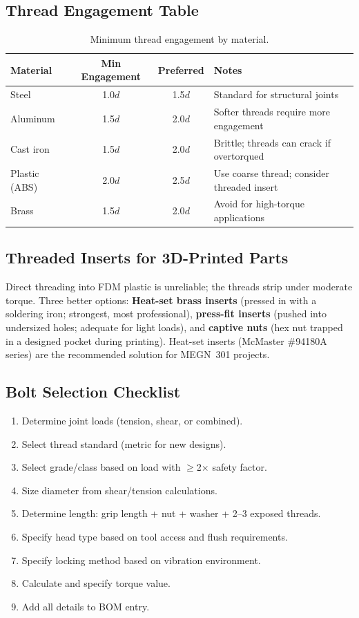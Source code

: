 \documentclass[11pt,letterpaper,twoside,openany]{book}
\begin{document}
\subsection{Thread Engagement Table}
\begin{table}[htbp]\centering\small
\begin{tabularx}{\textwidth}{l c c X}
\toprule
\textbf{Material} & \textbf{Min Engagement} & \textbf{Preferred} & \textbf{Notes} \\
\midrule
Steel & 1.0$d$ & 1.5$d$ & Standard for structural joints \\
Aluminum & 1.5$d$ & 2.0$d$ & Softer threads require more engagement \\
Cast iron & 1.5$d$ & 2.0$d$ & Brittle; threads can crack if overtorqued \\
Plastic (ABS) & 2.0$d$ & 2.5$d$ & Use coarse thread; consider threaded insert \\
Brass & 1.5$d$ & 2.0$d$ & Avoid for high-torque applications \\
\bottomrule
\end{tabularx}
\caption{Minimum thread engagement by material.}
\end{table}

\subsection{Threaded Inserts for 3D-Printed Parts}
Direct threading into FDM plastic is unreliable; the threads strip under moderate torque. Three better options: \textbf{Heat-set brass inserts} (pressed in with a soldering iron; strongest, most professional), \textbf{press-fit inserts} (pushed into undersized holes; adequate for light loads), and \textbf{captive nuts} (hex nut trapped in a designed pocket during printing). Heat-set inserts (McMaster \#94180A series) are the recommended solution for MEGN~301 projects.

\subsection{Bolt Selection Checklist}
\begin{enumerate}[nosep,leftmargin=1.5em]
\item Determine joint loads (tension, shear, or combined).
\item Select thread standard (metric for new designs).
\item Select grade/class based on load with $\geq$2$\times$ safety factor.
\item Size diameter from shear/tension calculations.
\item Determine length: grip length + nut + washer + 2--3 exposed threads.
\item Specify head type based on tool access and flush requirements.
\item Specify locking method based on vibration environment.
\item Calculate and specify torque value.
\item Add all details to BOM entry.
\end{enumerate}
\end{document}
